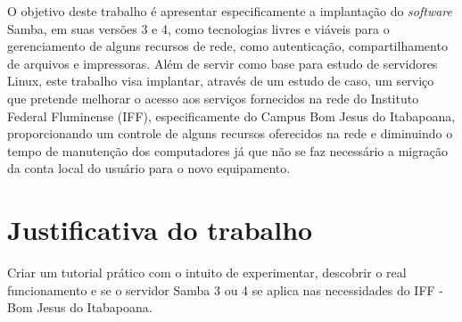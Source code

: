 O objetivo deste trabalho é apresentar especificamente a implantação do \textit{software} Samba, em suas versões 3 e 4, como tecnologias livres e viáveis para o gerenciamento de alguns recursos de rede, como autenticação, compartilhamento de arquivos e impressoras. Além de servir como base para estudo de servidores Linux, este trabalho visa implantar, através de um estudo de caso, um serviço que pretende melhorar o acesso aos serviços fornecidos na rede do Instituto Federal Fluminense (IFF), especificamente do Campus Bom Jesus do Itabapoana, proporcionando um controle de alguns recursos oferecidos na rede e diminuindo o tempo de manutenção dos computadores já que não se faz necessário a migração da conta local do usuário para o novo equipamento.

\section{Justificativa do trabalho}

Criar um tutorial prático com o intuito de experimentar, descobrir o real funcionamento e se o servidor Samba 3 ou 4 se aplica nas necessidades do IFF - Bom Jesus do Itabapoana.




